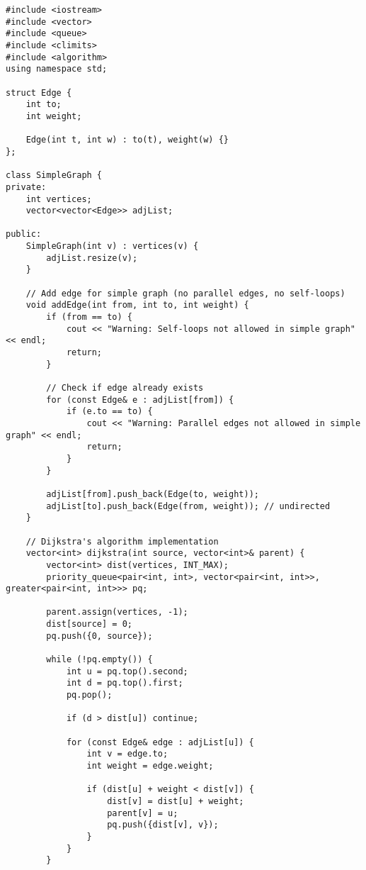 \documentclass[12pt,a4paper]{article}
\begin{document}
\begin{lstlisting}[caption={Thuật toán Dijkstra cho đồ thị đơn}]
#include <iostream>
#include <vector>
#include <queue>
#include <climits>
#include <algorithm>
using namespace std;

struct Edge {
    int to;
    int weight;
    
    Edge(int t, int w) : to(t), weight(w) {}
};

class SimpleGraph {
private:
    int vertices;
    vector<vector<Edge>> adjList;
    
public:
    SimpleGraph(int v) : vertices(v) {
        adjList.resize(v);
    }
    
    // Add edge for simple graph (no parallel edges, no self-loops)
    void addEdge(int from, int to, int weight) {
        if (from == to) {
            cout << "Warning: Self-loops not allowed in simple graph" << endl;
            return;
        }
        
        // Check if edge already exists
        for (const Edge& e : adjList[from]) {
            if (e.to == to) {
                cout << "Warning: Parallel edges not allowed in simple graph" << endl;
                return;
            }
        }
        
        adjList[from].push_back(Edge(to, weight));
        adjList[to].push_back(Edge(from, weight)); // undirected
    }
    
    // Dijkstra's algorithm implementation
    vector<int> dijkstra(int source, vector<int>& parent) {
        vector<int> dist(vertices, INT_MAX);
        priority_queue<pair<int, int>, vector<pair<int, int>>, greater<pair<int, int>>> pq;
        
        parent.assign(vertices, -1);
        dist[source] = 0;
        pq.push({0, source});
        
        while (!pq.empty()) {
            int u = pq.top().second;
            int d = pq.top().first;
            pq.pop();
            
            if (d > dist[u]) continue;
            
            for (const Edge& edge : adjList[u]) {
                int v = edge.to;
                int weight = edge.weight;
                
                if (dist[u] + weight < dist[v]) {
                    dist[v] = dist[u] + weight;
                    parent[v] = u;
                    pq.push({dist[v], v});
                }
            }
        }
        

\end{lstlisting}
\end{document}
